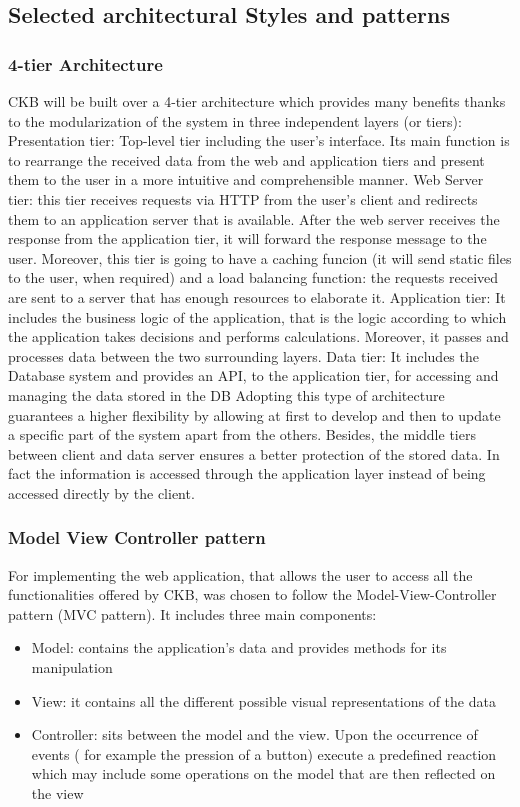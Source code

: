 \documentclass{article}
\begin{document}
\subsection{Selected architectural Styles and patterns}
\subsubsection{4-tier Architecture}
CKB will be built over a 4-tier architecture which provides many benefits thanks to the modularization of the system in three independent layers (or tiers):
Presentation tier: Top-level tier including the user’s interface. Its main function is to rearrange the received data from the web and application tiers and present them to the user in a more intuitive and comprehensible manner.
Web Server tier: this tier receives requests via HTTP from the user’s client and redirects them to an application server that is available. After the web server receives the response from the application tier, it will forward the response message to the user. Moreover, this tier is going to have a caching funcion (it will send static files to the user, when required) and a load balancing function: the requests received are sent to a server that has enough resources to elaborate it.
Application tier: It includes the business logic of the application, that is the logic according to which the application takes decisions and performs calculations. Moreover, it passes and processes data between the two surrounding layers.
 Data tier: It includes the Database system and provides an API, to the application tier, for accessing and managing the data stored in the DB
Adopting this type of architecture guarantees a higher flexibility by allowing at first to develop and then to update a specific part of the system apart from the others. Besides, the middle tiers between client and data server ensures a better protection of the stored data. In fact the information is accessed through the application layer instead of being accessed directly by the client.
\subsubsection{Model View Controller pattern}
For implementing the web application, that allows the user to access all the functionalities offered by CKB, was chosen to follow the Model-View-Controller pattern (MVC pattern). It includes three main components:
\begin{itemize}
\item Model: contains the application's data and provides methods for its manipulation
\item View: it contains all the different possible visual representations of the data
\item Controller: sits between the model and the view. Upon the occurrence of events ( for
example the pression of a button) execute a predefined reaction which may include
some operations on the model that are then reflected on the view
\end{itemize}
\end{document}
